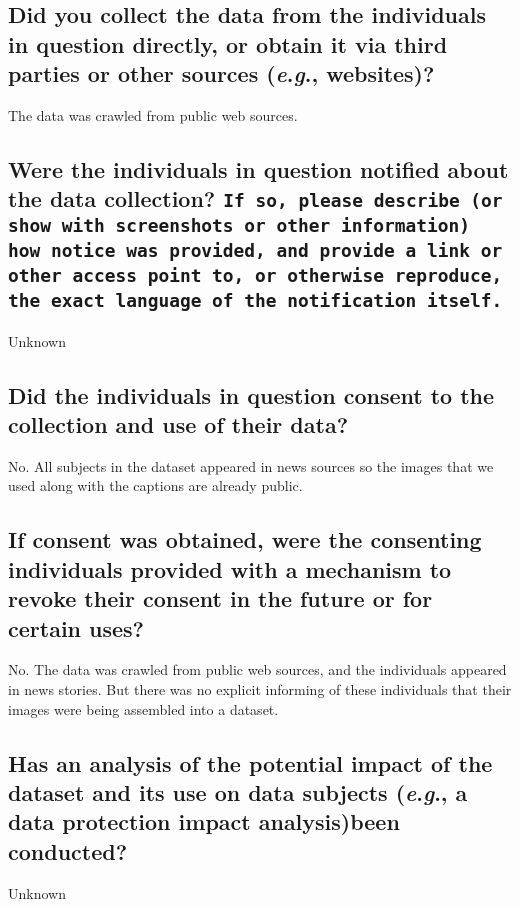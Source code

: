 \documentclass[a4paper,9pt]{extarticle}
\newcommand{\eg}{\textit{e}.\textit{g}., }
\begin{document}
\begin{multicols}{2}
\subsection*{Did you collect the data from the individuals in question directly, or obtain it via third parties or other sources (\eg websites)?}
\noindent The data was crawled from public web sources.

\subsection*{Were the individuals in question notified about the data collection? \texttt{If so, please describe (or show with screenshots or other information) how notice was provided, and provide a link or other access point to, or otherwise reproduce, the exact language of the notification itself.}}
\noindent Unknown

\subsection*{Did the individuals in question consent to the collection and use of their data?}

\noindent No. All subjects in the dataset appeared in news sources so the
images that we used along with the captions are already public.

\subsection*{If consent was obtained, were the consenting individuals provided with a mechanism to revoke their consent in the future or for certain uses?}
\noindent No. The data was crawled from public web sources, and the individuals appeared in news stories. But there was no explicit informing of these individuals that their images were being assembled into a dataset.

\subsection*{Has an analysis of the potential impact of the dataset and its use on data subjects (\eg a data protection impact analysis)been conducted?}
\noindent Unknown


\end{multicols}
\end{document}
